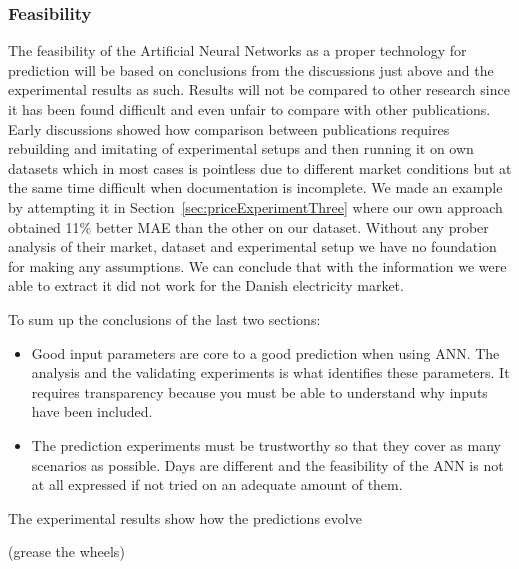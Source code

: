 \subsubsection{Feasibility}
The feasibility of the Artificial Neural Networks as a proper technology for prediction will be based on conclusions from the discussions just above and the experimental results as such. Results will not be compared to other research since it has been found difficult and even unfair to compare with other publications. Early discussions showed how comparison between publications requires rebuilding and imitating of experimental setups and then running it on own datasets which in most cases is pointless due to different market conditions but at the same time difficult when documentation is incomplete. We made an example by attempting it in Section~\ref{sec:priceExperimentThree} where our own approach obtained 11\% better MAE than the other on our dataset. Without any prober analysis of their market, dataset and experimental setup we have no foundation for making any assumptions. We can conclude that with the information we were able to extract it did not work for the Danish electricity market. 

To sum up the conclusions of the last two sections:

\begin{itemize}
\item Good input parameters are core to a good prediction when using ANN. The analysis and the validating experiments is what identifies these parameters. It requires transparency because you must be able to understand why inputs have been included.
\item The prediction experiments must be trustworthy so that they cover as many scenarios as possible. Days are different and the feasibility of the ANN is not at all expressed if not tried on an adequate amount of them.
\end{itemize}

The experimental results show how the predictions evolve 






(grease the wheels)




